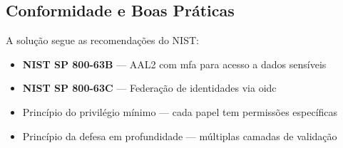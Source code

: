 \subsection{Conformidade e Boas Práticas}

A solução segue as recomendações do NIST:
\begin{itemize}
  \item \textbf{NIST SP 800-63B} — AAL2 com \gls{mfa} para acesso a dados sensíveis
  \item \textbf{NIST SP 800-63C} — Federação de identidades via \gls{oidc}
  \item Princípio do privilégio mínimo — cada papel tem permissões específicas
  \item Princípio da defesa em profundidade — múltiplas camadas de validação
\end{itemize}
